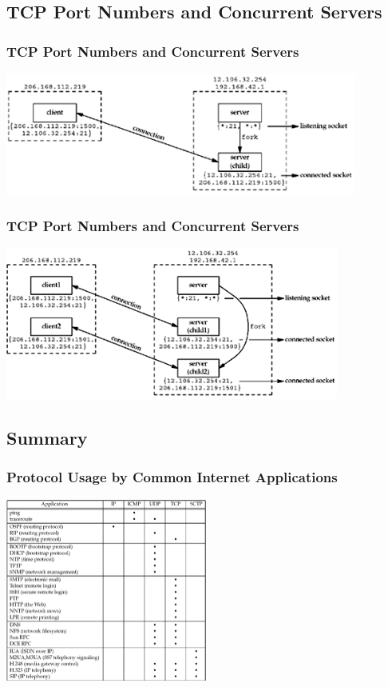 \documentclass[notes,serif]{beamer}
\begin{document}
\subsection{TCP Port Numbers and Concurrent Servers}
\begin{frame}
  \frametitle{TCP Port Numbers and Concurrent Servers}
  \begin{center}
  \includegraphics[height=4cm]{figs/02fig13.png}
  \end{center}
\end{frame}

\begin{frame}
  \frametitle{TCP Port Numbers and Concurrent Servers}
  \begin{center}
  \includegraphics[height=5cm]{figs/02fig14.png}
  \end{center}
\end{frame}


\subsection{Summary}
\begin{frame}
  \frametitle{Protocol Usage by Common Internet Applications}
  \begin{center}
  \includegraphics[height=6cm]{figs/02fig19.png}
  \end{center}
\end{frame}
\end{document}
